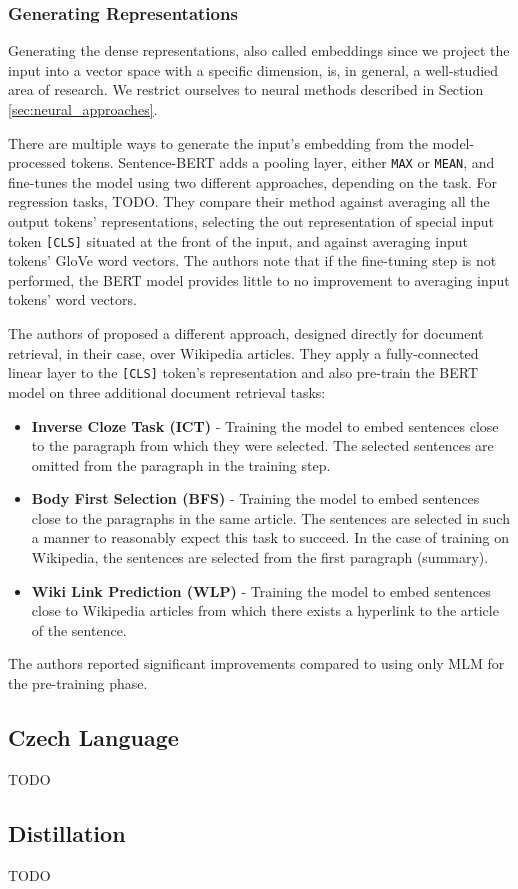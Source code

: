 \subsubsection{Generating Representations}

Generating the dense representations, also called embeddings since we project the input into a vector space with a specific dimension, is, in general, a well-studied area of research. We restrict ourselves to neural methods described in Section \ref{sec:neural_approaches}. 

There are multiple ways to generate the input's embedding from the model-processed tokens.
Sentence-BERT \citep{sbert} adds a pooling layer, either \texttt{MAX} or \texttt{MEAN}, and fine-tunes the model using two different approaches, depending on the task.
For regression tasks, TODO.
They compare their method against averaging all the output tokens' representations, selecting the out representation of special input token \texttt{[CLS]} situated at the front of the input, and against averaging input tokens' GloVe \citep{glove} word vectors.
The authors note that if the fine-tuning step is not performed, the BERT model provides little to no improvement to averaging input tokens' word vectors.

The authors of \citep{two-tower} proposed a different approach, designed directly for document retrieval, in their case, over Wikipedia articles. 
They apply a fully-connected linear layer to the \texttt{[CLS]} token's representation and also pre-train the BERT model on three additional document retrieval tasks:
\begin{itemize}
        \item \textbf{Inverse Cloze Task (ICT)} - Training the model to embed sentences close to the paragraph from which they were selected. The selected sentences are omitted from the paragraph in the training step.
        \item \textbf{Body First Selection (BFS)} - Training the model to embed sentences close to the paragraphs in the same article. The sentences are selected in such a manner to reasonably expect this task to succeed. In the case of training on Wikipedia, the sentences are selected from the first paragraph (summary).
        \item \textbf{Wiki Link Prediction (WLP)} - Training the model to embed sentences close to Wikipedia articles from which there exists a hyperlink to the article of the sentence.
\end{itemize}
The authors reported significant improvements compared to using only MLM for the pre-training phase.

\subsection{Czech Language}

TODO

\subsection{Distillation}

TODO